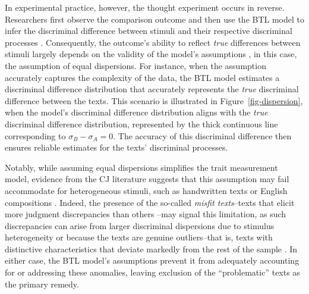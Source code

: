 \documentclass[
  authoryear,
  review,
  1p]{elsarticle}
\begin{document}
In experimental practice, however, the thought experiment occurs in
reverse. Researchers first observe the comparison outcome and then use
the BTL model to infer the discriminal difference between stimuli and
their respective discriminal processes \citep{Thurstone_1927a}.
Consequently, the outcome's ability to reflect \emph{true} differences
between stimuli largely depends on the validity of the model's
assumptions \citep{Kohler_et_al_2019}, in this case, the assumption of
equal dispersions. For instance, when the assumption accurately captures
the complexity of the data, the BTL model estimates a discriminal
difference distribution that accurately represents the \emph{true}
discriminal difference between the texts. This scenario is illustrated
in Figure~\ref{fig-dispersion}, when the model's discriminal difference
distribution aligns with the \emph{true} discriminal difference
distribution, represented by the thick continuous line corresponding to
\(\sigma_{B}-\sigma_{A}=0\). The accuracy of this discriminal difference
then ensures reliable estimates for the texts' discriminal processes.

Notably, while assuming equal dispersions simplifies the trait
measurement model, evidence from the CJ literature suggests that this
assumption may fail accommodate for heterogeneous stimuli, such as
handwritten texts or English compositions
\citep{Thurstone_1927a, Andrich_1978, Bramley_2008, Kelly_et_al_2022}.
Indeed, the presence of the so-called \emph{misfit texts}--texts that
elicit more judgment discrepancies than others
\citep{Pollitt_2004, Pollitt_2012b, Pollitt_2012a, Goossens_et_al_2018}--may
signal this limitation, as such discrepancies can arise from larger
discriminal dispersions due to stimulus heterogeneity or because the
texts are genuine outliers--that is, texts with distinctive
characteristics that deviate markedly from the rest of the sample
\citep{Grubbs_1969}. In either case, the BTL model's assumptions prevent
it from adequately accounting for or addressing these anomalies, leaving
exclusion of the ``problematic'' texts as the primary remedy.
\end{document}
